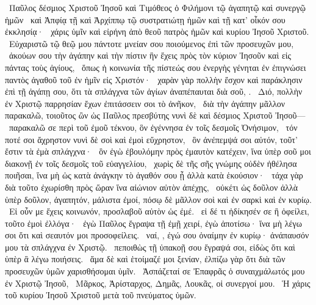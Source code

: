 ~Παῦλος δέσμιος Χριστοῦ Ἰησοῦ καὶ Τιμόθεος ὁ  Φιλήμονι τῷ ἀγαπητῷ καὶ συνεργῷ ἡμῶν
~καὶ Ἀπφίᾳ τῇ  καὶ Ἀρχίππῳ τῷ συστρατιώτῃ ἡμῶν καὶ τῇ κατ’ οἶκόν σου ἐκκλησίᾳ·
~χάρις ὑμῖν καὶ εἰρήνη ἀπὸ θεοῦ πατρὸς ἡμῶν καὶ κυρίου Ἰησοῦ Χριστοῦ.
~Εὐχαριστῶ τῷ θεῷ μου πάντοτε μνείαν σου ποιούμενος ἐπὶ τῶν προσευχῶν μου,
~ἀκούων σου τὴν ἀγάπην καὶ τὴν πίστιν ἣν ἔχεις πρὸς τὸν κύριον Ἰησοῦν καὶ εἰς πάντας τοὺς ἁγίους,
~ὅπως ἡ κοινωνία τῆς πίστεώς σου ἐνεργὴς γένηται ἐν ἐπιγνώσει παντὸς ἀγαθοῦ τοῦ ἐν ἡμῖν εἰς Χριστόν·
~χαρὰν γὰρ πολλὴν ἔσχον καὶ παράκλησιν ἐπὶ τῇ ἀγάπῃ σου, ὅτι τὰ σπλάγχνα τῶν ἁγίων ἀναπέπαυται διὰ σοῦ, .
~Διό, πολλὴν ἐν Χριστῷ παρρησίαν ἔχων ἐπιτάσσειν σοι τὸ ἀνῆκον,
~διὰ τὴν ἀγάπην μᾶλλον παρακαλῶ, τοιοῦτος ὢν ὡς Παῦλος πρεσβύτης νυνὶ δὲ καὶ δέσμιος Χριστοῦ Ἰησοῦ—
~παρακαλῶ σε περὶ τοῦ ἐμοῦ τέκνου, ὃν ἐγέννησα ἐν τοῖς δεσμοῖς Ὀνήσιμον,
~τόν ποτέ σοι ἄχρηστον νυνὶ δὲ σοὶ καὶ ἐμοὶ εὔχρηστον,
~ὃν ἀνέπεμψά σοι αὐτόν, τοῦτ’ ἔστιν τὰ ἐμὰ σπλάγχνα·
~ὃν ἐγὼ ἐβουλόμην πρὸς ἐμαυτὸν κατέχειν, ἵνα ὑπὲρ σοῦ μοι διακονῇ ἐν τοῖς δεσμοῖς τοῦ εὐαγγελίου,
~χωρὶς δὲ τῆς σῆς γνώμης οὐδὲν ἠθέλησα ποιῆσαι, ἵνα μὴ ὡς κατὰ ἀνάγκην τὸ ἀγαθόν σου ᾖ ἀλλὰ κατὰ ἑκούσιον·
~τάχα γὰρ διὰ τοῦτο ἐχωρίσθη πρὸς ὥραν ἵνα αἰώνιον αὐτὸν ἀπέχῃς,
~οὐκέτι ὡς δοῦλον ἀλλὰ ὑπὲρ δοῦλον,  ἀγαπητόν, μάλιστα ἐμοί, πόσῳ δὲ μᾶλλον σοὶ καὶ ἐν σαρκὶ καὶ ἐν κυρίῳ.
~Εἰ οὖν με ἔχεις κοινωνόν, προσλαβοῦ αὐτὸν ὡς ἐμέ.
~εἰ δέ τι ἠδίκησέν σε ἢ ὀφείλει, τοῦτο ἐμοὶ ἐλλόγα·
~ἐγὼ Παῦλος ἔγραψα τῇ ἐμῇ χειρί, ἐγὼ ἀποτίσω· ἵνα μὴ λέγω σοι ὅτι καὶ σεαυτόν μοι προσοφείλεις.
~ναί, , ἐγώ σου ὀναίμην ἐν κυρίῳ· ἀνάπαυσόν μου τὰ σπλάγχνα ἐν Χριστῷ.
~πεποιθὼς τῇ ὑπακοῇ σου ἔγραψά σοι, εἰδὼς ὅτι καὶ ὑπὲρ ἃ λέγω ποιήσεις.
~ἅμα δὲ καὶ ἑτοίμαζέ μοι ξενίαν, ἐλπίζω γὰρ ὅτι διὰ τῶν προσευχῶν ὑμῶν χαρισθήσομαι ὑμῖν.
~Ἀσπάζεταί σε Ἐπαφρᾶς ὁ συναιχμάλωτός μου ἐν Χριστῷ Ἰησοῦ,
~Μᾶρκος, Ἀρίσταρχος, Δημᾶς, Λουκᾶς, οἱ συνεργοί μου.
~Ἡ χάρις τοῦ κυρίου Ἰησοῦ Χριστοῦ μετὰ τοῦ πνεύματος ὑμῶν.
